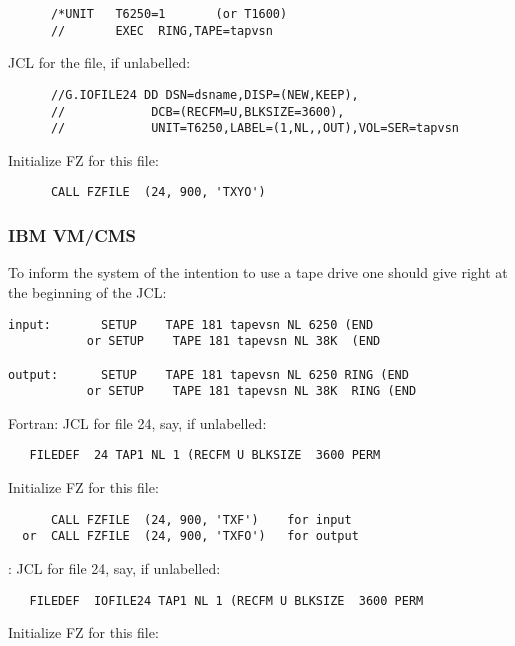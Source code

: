 \begin{verbatim}
      /*UNIT   T6250=1       (or T1600)
      //       EXEC  RING,TAPE=tapvsn
\end{verbatim}

JCL for the file, if unlabelled:

\begin{verbatim}
      //G.IOFILE24 DD DSN=dsname,DISP=(NEW,KEEP),
      //            DCB=(RECFM=U,BLKSIZE=3600),
      //            UNIT=T6250,LABEL=(1,NL,,OUT),VOL=SER=tapvsn
\end{verbatim}

Initialize FZ for this file:

\begin{verbatim}
      CALL FZFILE  (24, 900, 'TXYO')
\end{verbatim}

\subsubsection*{IBM VM/CMS}

To inform the system of the intention to use a tape drive
one should give right at the beginning of the JCL:

\begin{verbatim}
input:       SETUP    TAPE 181 tapevsn NL 6250 (END
           or SETUP    TAPE 181 tapevsn NL 38K  (END

output:      SETUP    TAPE 181 tapevsn NL 6250 RING (END
           or SETUP    TAPE 181 tapevsn NL 38K  RING (END
\end{verbatim}

Fortran:  JCL for file 24, say, if unlabelled:

\begin{verbatim}
   FILEDEF  24 TAP1 NL 1 (RECFM U BLKSIZE  3600 PERM
\end{verbatim}

Initialize FZ for this file:

\begin{verbatim}
      CALL FZFILE  (24, 900, 'TXF')    for input
  or  CALL FZFILE  (24, 900, 'TXFO')   for output
\end{verbatim}

:  JCL for file 24, say, if unlabelled:

\begin{verbatim}
   FILEDEF  IOFILE24 TAP1 NL 1 (RECFM U BLKSIZE  3600 PERM
\end{verbatim}

Initialize FZ for this file:

